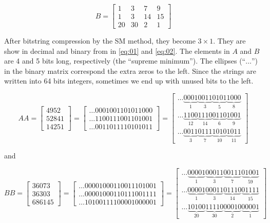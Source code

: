 \documentclass[10pt]{article}
\begin{document}
\begin{equation}
	B = \begin{bmatrix}
			1  & 3  & 7 & 9\\ 
			1  &3   & 14 & 15\\ 
			20 & 30 & 2 & 1
		\end{bmatrix}
\end{equation}

After bitstring compression by the SM method, they become $3 \times 1$. They
are show in decimal and binary from in \ref{eq:01} and
\ref{eq:02}. The elements in $A$ and $B$ are 4 and 5 bits long, respectively
(the ``supreme minimum''). The ellipses (``$\ldots$'') in the binary matrix
correspond the extra zeros to the left. Since the strings are written into 64
bits integers, sometimes we end up with unused bits to the left.

\begin{equation}\label{eq:01}
	AA = \begin{bmatrix}
			4952\\ 
			52841\\ 
			14251
		\end{bmatrix} 
        =
        \begin{bmatrix}
			\ldots0001001101011000\\ 
			\ldots1100111001101001\\ 
			\ldots0011011110101011
		\end{bmatrix}
        =
        \begin{bmatrix}
\ldots\underbrace{0001}_{1}\underbrace{0011}_{3}\underbrace{0101}_{5}\underbrace
{1000}_{8}\\
\ldots\underbrace{1100}_{12}\underbrace{1110}_{14}\underbrace{0110}_{6}
\underbrace{1001}_{9}\\ 
\ldots\underbrace{0011}_{3}\underbrace{0111}_{7}\underbrace{1010}_{10}
\underbrace{1011}_{11}
	\end{bmatrix}
\end{equation}

and

\begin{equation}\label{eq:02}
	BB = \begin{bmatrix}
			36073\\ 
			36303\\ 
			686145
		\end{bmatrix}
        =
         \begin{bmatrix}
			\ldots00001000110011101001\\ 
			\ldots00001000110111001111\\ 
			\ldots10100111100001000001
		\end{bmatrix}
        =
        \begin{bmatrix}

\ldots\underbrace{00001}_{1}\underbrace{00011}_{3}\underbrace{00111}_{7}
\underbrace{01001}_{59}\\
\ldots\underbrace{00001}_{1}\underbrace{00011}_{3}\underbrace{01110}_{14}
\underbrace{01111}_{15}\\
\ldots\underbrace{10100}_{20}\underbrace{11110}_{30}\underbrace{00010}_{2}
\underbrace{00001}_{1}
		\end{bmatrix}
\end{equation}
\end{document}

